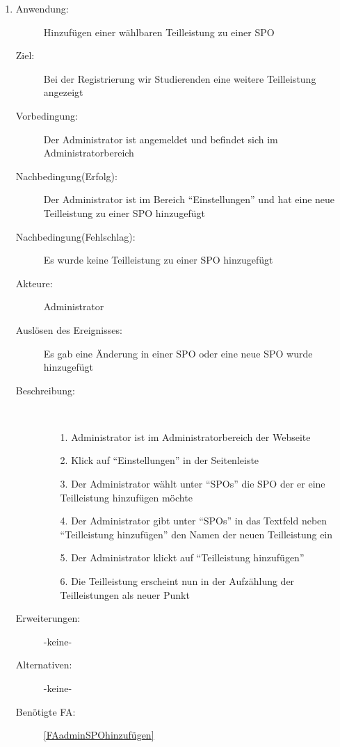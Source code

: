 \documentclass[parskip=full]{scrartcl}
\newcommand{\swtLabel}[1]{\textbf{/#1\arabic*0/}}
\begin{document}
\begin{enumerate} [label=\swtLabel{A}]
  \item \label{UCadminSPOteilleistungAdd}
    \begin{description}
    \item[Anwendung:] Hinzufügen einer wählbaren \gls{Teilleistung} zu einer
    \gls{SPO}
    \item[Ziel:] Bei der Registrierung wir Studierenden eine weitere
    Teilleistung angezeigt
    \item[Vorbedingung:] Der Administrator ist angemeldet und befindet sich im Administratorbereich
    \item[Nachbedingung(Erfolg):] Der Administrator ist im Bereich
    \enquote{Einstellungen} und hat eine neue Teilleistung zu einer SPO
    hinzugefügt
    \item[Nachbedingung(Fehlschlag):] Es wurde keine Teilleistung zu einer SPO
    hinzugefügt
    \item[Akteure:] Administrator
    \item[Auslösen des Ereignisses:] Es gab eine Änderung in einer SPO oder eine
    neue SPO wurde hinzugefügt
    \item[Beschreibung:]~
    \begin{enumerate}
      \item[1.] Administrator ist im Administratorbereich der Webseite
      \item[2.] Klick auf \enquote{Einstellungen} in der Seitenleiste
      \item[3.] Der Administrator wählt unter \enquote{SPOs} die SPO der er eine
      Teilleistung hinzufügen möchte
      \item[4.] Der Administrator gibt unter \enquote{SPOs} in das Textfeld
      neben \enquote{Teilleistung hinzufügen} den Namen der neuen Teilleistung
      ein
      \item[5.] Der Administrator klickt auf \enquote{Teilleistung hinzufügen}
      \item[6.] Die Teilleistung erscheint nun in der Aufzählung der
      Teilleistungen als neuer Punkt
    \end{enumerate}
    \item[Erweiterungen:] -keine-
    \item[Alternativen:] -keine-
    \item[Benötigte FA:] \ref{FAadminSPOhinzufügen}
  \end{description}
  

\end{enumerate}
\end{document}

